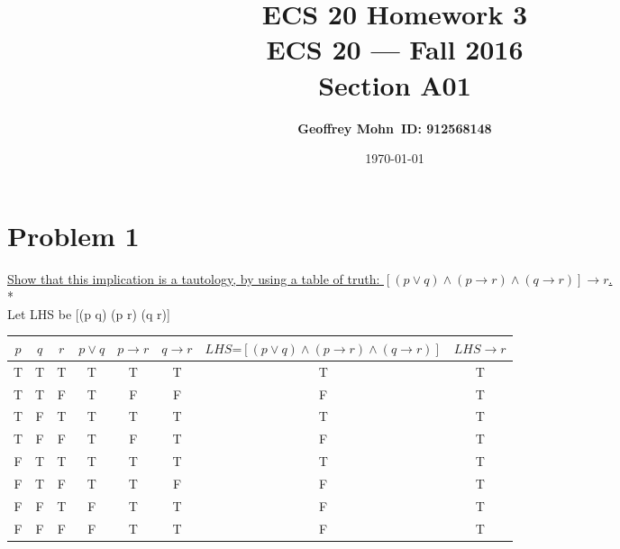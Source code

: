 \documentclass[11pt]{article}
\title{\bf ECS 20 Homework 3\\[2ex] 
	\rm\normalsize ECS 20 --- Fall 2016\\ Section A01}
\date{\today}
\author{\bf Geoffrey Mohn\ ID: 912568148}
\begin{document}
	\maketitle
	
	
	\section*{Problem 1} 
	{\underline{Show that this implication is a tautology, by using a table of truth: $[(p\lor q)\land(p\rightarrow r)\land(q\rightarrow r)] \rightarrow r$.}\\*\\
		Let LHS be [(p \lor q) \land (p \rightarrow r) \land (q \rightarrow r)]

\begin{table}[!hbt]
	\begin{tabular}{|c|c|c||c|c|c|c||c|}
		\hline
		$p$ & $q$ & $r$ & $p \lor q$ & $p \rightarrow r$ & $q \rightarrow r$ & $ LHS \text{=} [(p \lor q) \land (p \rightarrow r) \land (q \rightarrow r)] $ & $LHS \rightarrow r$\\
		\hline
		T & T & T & T & T & T & T & T\\
		T & T & F & T & F & F & F & T\\
		T & F & T & T & T & T & T & T\\
		T & F & F & T & F & T & F & T\\
		F & T & T & T & T & T & T & T\\
		F & T & F & T & T & F & F & T\\
		F & F & T & F & T & T & F & T\\
		F & F & F & F & T & T & F & T\\
		\hline
	\end{tabular}
\end{table}
}
\end{document}
